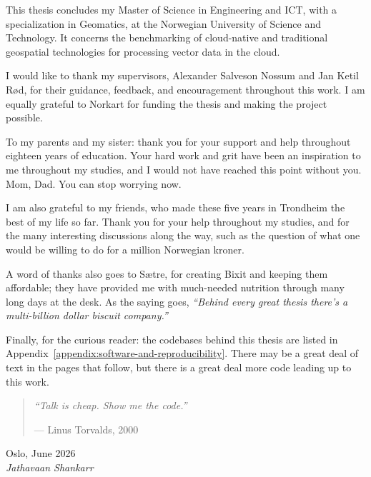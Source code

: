 This thesis concludes my Master of Science in Engineering and ICT, with a
specialization in Geomatics, at the Norwegian University of Science and
Technology. It concerns the benchmarking of cloud-native and traditional
geospatial technologies for processing vector data in the cloud.

I would like to thank my supervisors, Alexander Salveson Nossum and Jan Ketil
Rød, for their guidance, feedback, and encouragement throughout this work. I am
equally grateful to Norkart for funding the thesis and making the project
possible.

To my parents and my sister: thank you for your support and help throughout
eighteen years of education. Your hard work and grit have been an inspiration to
me throughout my studies, and I would not have reached this point without you.
Mom, Dad. You can stop worrying now.

I am also grateful to my friends, who made these five years in Trondheim the
best of my life so far. Thank you for your help throughout my studies, and for
the many interesting discussions along the way, such as the question of what one
would be willing to do for a million Norwegian kroner.

A word of thanks also goes to Sætre, for creating Bixit and keeping them
affordable; they have provided me with much-needed nutrition through many long
days at the desk. As the saying goes, \emph{``Behind every great thesis there's a multi-billion dollar biscuit company.''}

Finally, for the curious reader: the codebases behind this thesis are listed in
Appendix~\ref{appendix:software-and-reproducibility}. There may be a great deal of text in the pages that
follow, but there is a great deal more code leading up to this work.

\begin{quote}
    \itshape\large
    ``Talk is cheap. Show me the code.''
    \begin{flushright}
        \normalfont\normalsize --- Linus Torvalds, 2000
    \end{flushright}
\end{quote}

\vspace{1.5em}
\noindent Oslo, June 2026 \\
\noindent \textit{Jathavaan Shankarr}